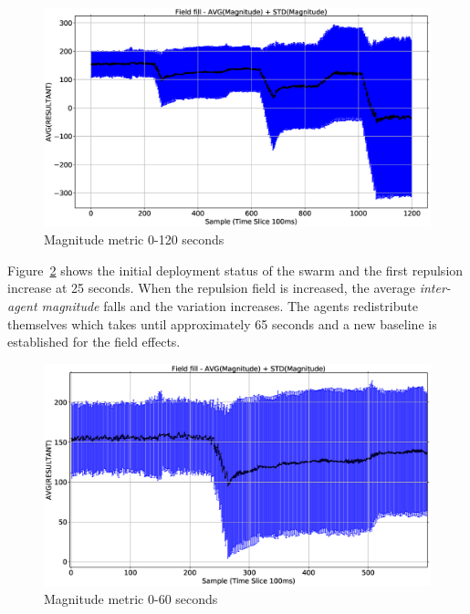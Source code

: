 \begin{figure}[H]
\begin{center}
\includegraphics[width=12cm]{CHAPTER-8/figures/FIELDFILL-MAG}
\end{center}
\caption{Magnitude metric 0-120 seconds\label{emerge:FIELDFILL-MAG}}
\end{figure}

Figure~\ref{emerge:FIELDFILL-MAG-1} shows the initial deployment status of the swarm and the first repulsion increase at 25 seconds. When the repulsion field is increased, the average \textit{inter-agent magnitude} falls and the variation increases. The agents redistribute themselves which takes until approximately 65 seconds and a new baseline is established for the field effects.

\begin{figure}[H]
\begin{center}
\includegraphics[width=12cm]{CHAPTER-8/figures/FIELDFILL-MAG-1}
\end{center}
\caption{Magnitude metric 0-60 seconds\label{emerge:FIELDFILL-MAG-1}}
\end{figure}


